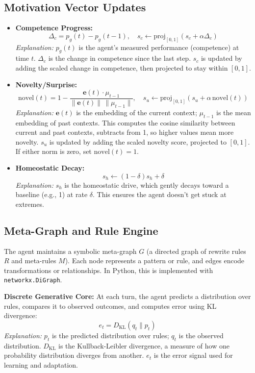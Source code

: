 \documentclass[11pt]{article}
\begin{document}
\subsection{Motivation Vector Updates}
\begin{itemize}
  \item \textbf{Competence Progress:}
  \[
    \Delta_c = p_g(t) - p_g(t-1), \quad s_c \leftarrow \mathrm{proj}_{[0,1]}(s_c + \alpha \Delta_c)
  \]
  \textit{Explanation:} $p_g(t)$ is the agent's measured performance (competence) at time $t$. $\Delta_c$ is the change in competence since the last step. $s_c$ is updated by adding the scaled change in competence, then projected to stay within $[0,1]$.
  \item \textbf{Novelty/Surprise:}
  \[
    \mathrm{novel}(t) = 1 - \frac{\mathbf{e}(t) \cdot \mu_{t-1}}{\|\mathbf{e}(t)\|\,\|\mu_{t-1}\|}, \quad s_u \leftarrow \mathrm{proj}_{[0,1]}(s_u + \alpha\,\mathrm{novel}(t))
  \]
  \textit{Explanation:} $\mathbf{e}(t)$ is the embedding of the current context; $\mu_{t-1}$ is the mean embedding of past contexts. This computes the cosine similarity between current and past contexts, subtracts from 1, so higher values mean more novelty. $s_u$ is updated by adding the scaled novelty score, projected to $[0,1]$. If either norm is zero, set $\mathrm{novel}(t) = 1$.
  \item \textbf{Homeostatic Decay:}
  \[
    s_h \leftarrow (1-\delta)s_h + \delta
  \]
  \textit{Explanation:} $s_h$ is the homeostatic drive, which gently decays toward a baseline (e.g., 1) at rate $\delta$. This ensures the agent doesn't get stuck at extremes.
\end{itemize}

\subsection{Meta-Graph and Rule Engine}
The agent maintains a symbolic meta-graph $G$ (a directed graph of rewrite rules $R$ and meta-rules $M$). Each node represents a pattern or rule, and edges encode transformations or relationships. In Python, this is implemented with \texttt{networkx.DiGraph}.

\textbf{Discrete Generative Core:}
At each turn, the agent predicts a distribution over rules, compares it to observed outcomes, and computes error using KL divergence:
\[
  e_t = D_{\mathrm{KL}}(q_t\|p_t)
\]
\textit{Explanation:} $p_t$ is the predicted distribution over rules; $q_t$ is the observed distribution. $D_{\mathrm{KL}}$ is the Kullback-Leibler divergence, a measure of how one probability distribution diverges from another. $e_t$ is the error signal used for learning and adaptation.
\end{document}
